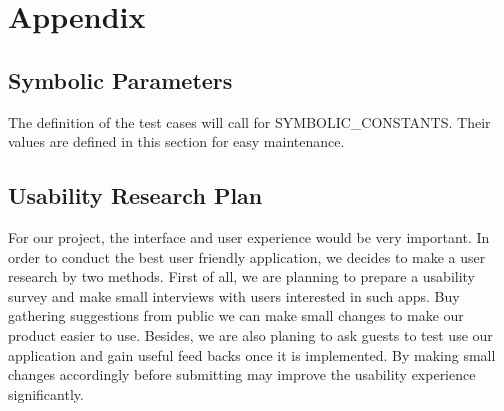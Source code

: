 \documentclass[12pt, titlepage]{article}
\begin{document}
				


% 

\newpage

\section{Appendix}

\subsection{Symbolic Parameters}

The definition of the test cases will call for SYMBOLIC\_CONSTANTS.
Their values are defined in this section for easy maintenance.
\subsection{Usability Research Plan}
For our project, the interface and user experience would be very important. In order to conduct the best user friendly application, we decides to make a user research by two methods. First of all, we are planning to prepare a usability survey and make small interviews with users interested in such apps. Buy gathering suggestions from public we can make small changes to make our product easier to use. Besides, we are also planing to ask guests to test use our application and gain useful feed backs once it is implemented. By making small changes accordingly before submitting may improve the usability experience significantly.
\end{document}
